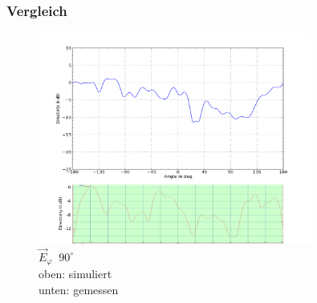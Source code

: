 \subsubsection{Vergleich}

\begin{figure}[h!]
	\centering
	\includegraphics[width=0.8\textwidth]{../fig/plt/comparison_l4_pcb_v2c_laptop_1a_105_etot_phi90_2ghz4.png}
	\caption{$\vec{E}_{\varphi} \;\; 90^\circ$\\
		\hspace*{107pt}oben: simuliert\\
		\hspace*{115pt}unten: gemessen}
	\label{fig:E_tot_90}
\end{figure}

